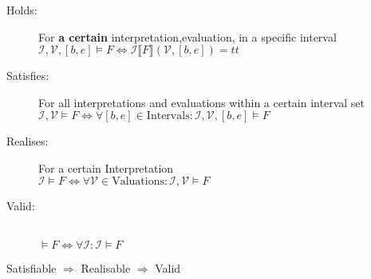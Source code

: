 \begin{tcolorbox}[colback=kapiteleins!5!white, colframe=red!75!black,
  title=\textbf{Validity, Realizability, satisfyability}]
  \begin{description}
  \item[Holds:] For \textbf{a certain} interpretation,evaluation, in a specific
    interval\\
    $\mathcal{I,V},[b,e]\models F \Leftrightarrow
    \mathcal{I}\llbracket F \rrbracket (\mathcal{V},[b,e])=tt$
  \item[Satisfies:] For all interpretations and evaluations within a certain
    interval set\\
    $\mathcal{I,V}\models F \Leftrightarrow
    \forall [b,e]\in \mathrm{Intervals}: \mathcal{I,V},[b,e]\models F$
  \item[Realises:] For a certain Interpretation\\
    $\mathcal{I}\models F
    \Leftrightarrow \forall \mathcal{V}\in \mathrm{Valuations}:
    \mathcal{I,V}\models F$
  \item[Valid:] \ \\
    $\models F
    \Leftrightarrow \forall \mathcal{I}:\mathcal{I}\models F$
  \end{description}
  Satisfiable $\Rightarrow$ Realisable $\Rightarrow$ Valid
\end{tcolorbox}

